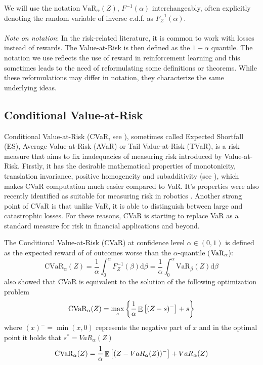 We will use the notation $\text{VaR}_\alpha(Z)$, $F^{-1}(\alpha)$ interchangeably, often explicitly denoting the random variable of inverse c.d.f. as $F^{-1}_Z(\alpha)$.
\\
\\
\textit{Note on notation}: In the risk-related literature, it is common to work with losses instead of rewards. The Value-at-Risk is then defined as the $1-\alpha$ quantile. The notation we use reflects the use of reward in reinforcement learning and this sometimes leads to the need of reformulating some definitions or theorems. While these reformulations may differ in notation, they characterize the same underlying ideas.

\subsection{Conditional Value-at-Risk}

Conditional Value-at-Risk (CVaR, see \citet{rockafellar2000optimization,rockafellar2002conditional}), sometimes called Expected Shortfall (ES), Average Value-at-Risk (AVaR) or Tail Value-at-Risk (TVaR), is a risk measure that aims to fix inadequacies of measuring risk introduced by Value-at-Risk. Firstly, it has the desirable mathematical properties of monotonicity, translation invariance, positive homogeneity and subadditivity (see \citet{artzner1999coherent}), which makes CVaR computation much easier compared to VaR. It's properties were also recently identified as suitable for measuring risk in robotics \cite{majumdar2017should}. Another strong point of CVaR is that unlike VaR, it is able to distinguish between large and catastrophic losses. For these reasons, CVaR is starting to replace VaR as a standard measure for risk in financial applications \citep{basel2013fundamental} and beyond.

The Conditional Value-at-Risk (CVaR) at confidence level $\alpha \in (0,1)$ is defined as the expected reward of of outcomes worse than the $\alpha$-quantile ($\text{VaR}_\alpha$):
\begin{equation}\label{eqn:cvardef}
\text{CVaR}_\alpha(Z) = \dfrac{1}{\alpha}\int_0^\alpha F^{-1}_Z(\beta) \text{d}\beta = \dfrac{1}{\alpha}\int_0^\alpha \text{VaR}_\beta(Z) \text{d}\beta
\end{equation}
\citet{rockafellar2000optimization} also showed that CVaR is equivalent to the solution of the following optimization problem
\begin{equation}\label{eqn:cvarprimal}
\text{CVaR}_\alpha(Z)=
\max_s\left\lbrace \dfrac{1}{\alpha}\mathop{\mathbb{E}}
\left[ (Z-s)^-\right] + s  \right\rbrace 
\end{equation}
where $(x)^- = \min(x, 0)$ represents the negative part of $x$ and in the optimal point it holds that $s^* = VaR_\alpha(Z)$
\begin{equation}
\text{CVaR}_\alpha(Z)= \dfrac{1}{\alpha}\mathop{\mathbb{E}} \left[ (Z-VaR_\alpha(Z))^-\right] + VaR_\alpha(Z)
\end{equation}


